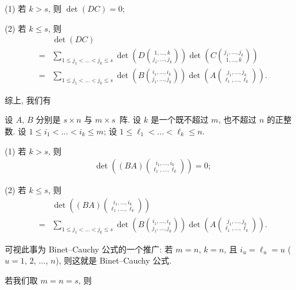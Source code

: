 (1)
若 \(k > s\), 则 \(\det {(DC)} = 0\);

(2)
若 \(k \leq s\), 则
\begin{align*}
         & \det {(DC)}
    \\
    = {} & \sum_{1 \leq j_1 < \dots < j_k \leq s}
    {
        \det {\left(
            D\binom{1, \dots, k}{j_1, \dots, j_k}
            \right)}
        \det {\left(
            C\binom{j_1, \dots, j_k}{1, \dots, k}
            \right)}
    }
    \\
    = {} & \sum_{1 \leq j_1 < \dots < j_k \leq s}
    {
        \det {\left(
            B\binom{i_1, \dots, i_k}{j_1, \dots, j_k}
            \right)}
        \det {\left(
            A\binom{j_1, \dots, j_k}{\ell_1, \dots, \ell_k}
            \right)}
    }.
\end{align*}

综上, 我们有

\begin{theorem}
    设 \(A\), \(B\) 分别是 \(s \times n\) 与 \(m \times s\)~阵.
    设 \(k\) 是一个既不超过 \(m\), 也不超过 \(n\) 的正整数.
    设 \(1 \leq i_1 < \dots < i_k \leq m\);
    设 \(1 \leq \ell_1 < \dots < \ell_k \leq n\).

    (1)
    若 \(k > s\), 则
    \begin{align*}
        \det {\left(
            (BA)\binom{i_1,\dots,i_k}{\ell_1,\dots,\ell_k}
            \right)} = 0;
    \end{align*}

    (2)
    若 \(k \leq s\), 则
    \begin{align*}
             & \det {\left(
            (BA)\binom{i_1,\dots,i_k}{\ell_1,\dots,\ell_k}
            \right)}
        \\
        = {} & \sum_{1 \leq j_1 < \dots < j_k \leq s}
        {
            \det {\left(
                B\binom{i_1, \dots, i_k}{j_1, \dots, j_k}
                \right)}
            \det {\left(
                A\binom{j_1, \dots, j_k}{\ell_1, \dots, \ell_k}
                \right)}
        }.
    \end{align*}
\end{theorem}

可视此事为 Binet--Cauchy 公式的一个推广:
若 \(m = n\), \(k = n\),
且
\(i_u = \ell_u = u\) (\(u = 1\), \(2\), \(\dots\), \(n\)),
则这就是 Binet--Cauchy 公式.

\vspace{2ex}

若我们取 \(m = n = s\), 则

